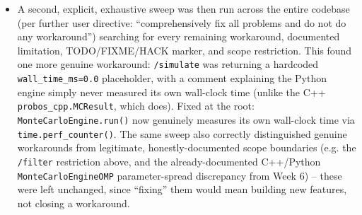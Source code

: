 \documentclass[11pt]{article}
\begin{document}
\begin{itemize}[leftmargin=*]
    The initial response was to document this as a known limitation
    and weaken the affected tests to structural-only assertions. Per
    explicit user feedback that this was insufficiently thorough, the
    ROOT CAUSE was fixed instead: all three models now own a private,
    per-instance \texttt{np.random.default\_rng(seed)}, the same
    correctly-seeded-Generator pattern already used by
    \texttt{MonteCarloEngine}/\texttt{ParticleFilter}/
    \texttt{SobolSensitivity} themselves. This let three further
    things happen for real, not just in theory:
    \begin{itemize}
      \item The REST API's \texttt{seed} field now genuinely
        reproduces results for ALL four models, verified directly
        (two identical API calls, same seed, identical JSON).
      \item The Week 9 integration tests were restored to the SAME
        \texttt{rtol=1e-10} exact-match standard already used for
        \texttt{BatteryModel2Cell}, rather than a weaker fallback.
      \item Week 8's explicit \texttt{np.random.seed()} doctrine
        exception (added specifically because
        \texttt{EDQueueModel} had no other way to be made
        reproducible, with manual global-state save/restore via
        \texttt{try/finally}) was REMOVED entirely -- no longer
        needed, since the model now handles its own reproducibility
        correctly.
    \end{itemize}
  \item A second, explicit, exhaustive sweep was then run across the
    entire codebase (per further user directive: ``comprehensively
    fix all problems and do not do any workaround'') searching for
    every remaining workaround, documented limitation, TODO/FIXME/HACK
    marker, and scope restriction. This found one more genuine
    workaround: \texttt{/simulate} was returning a hardcoded
    \texttt{wall\_time\_ms=0.0} placeholder, with a comment explaining
    the Python engine simply never measured its own wall-clock time
    (unlike the C++ \texttt{probos\_cpp.MCResult}, which does). Fixed
    at the root: \texttt{MonteCarloEngine.run()} now genuinely
    measures its own wall-clock time via \texttt{time.perf\_counter()}.
    The same sweep also correctly distinguished genuine workarounds
    from legitimate, honestly-documented scope boundaries (e.g. the
    \texttt{/filter} restriction above, and the already-documented
    C++/Python \texttt{MonteCarloEngineOMP} parameter-spread
    discrepancy from Week 6) -- these were left unchanged, since
    ``fixing'' them would mean building new features, not closing a
    workaround.
\end{itemize}
\end{document}

